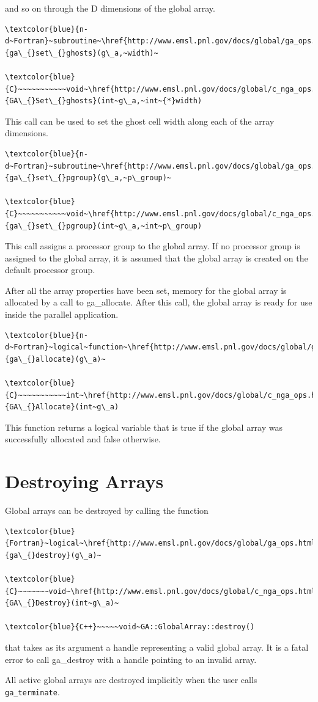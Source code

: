 and so on through the D dimensions of the global array.
\begin{verbatim}
\textcolor{blue}{n-d~Fortran}~subroutine~\href{http://www.emsl.pnl.gov/docs/global/ga_ops.html\#NGA_SET_GHOSTS}{ga\_{}set\_{}ghosts}(g\_a,~width)~

\textcolor{blue}{C}~~~~~~~~~~~void~\href{http://www.emsl.pnl.gov/docs/global/c_nga_ops.html\#GA_SET_GHOSTS}{GA\_{}Set\_{}ghosts}(int~g\_a,~int~{*}width)
\end{verbatim}
This call can be used to set the ghost cell width along each of the
array dimensions.
\begin{verbatim}
\textcolor{blue}{n-d~Fortran}~subroutine~\href{http://www.emsl.pnl.gov/docs/global/ga_ops.html\#GA_SET_PGROUP}{ga\_{}set\_{}pgroup}(g\_a,~p\_group)~

\textcolor{blue}{C}~~~~~~~~~~~void~\href{http://www.emsl.pnl.gov/docs/global/c_nga_ops.html\#GA_SET_PGROUP}{ga\_{}set\_{}pgroup}(int~g\_a,~int~p\_group)
\end{verbatim}
This call assigns a processor group to the global array. If no processor
group is assigned to the global array, it is assumed that the global
array is created on the default processor group.

After all the array properties have been set, memory for the global
array is allocated by a call to ga\_allocate. After this call, the
global array is ready for use inside the parallel application.
\begin{verbatim}
\textcolor{blue}{n-d~Fortran}~logical~function~\href{http://www.emsl.pnl.gov/docs/global/ga_ops.html\#GA_ALLOCATE}{ga\_{}allocate}(g\_a)~

\textcolor{blue}{C}~~~~~~~~~~~int~\href{http://www.emsl.pnl.gov/docs/global/c_nga_ops.html\#GA_ALLOCATE}{GA\_{}Allocate}(int~g\_a)
\end{verbatim}
This function returns a logical variable that is true if the global
array was successfully allocated and false otherwise. 


\section{Destroying Arrays }

Global arrays can be destroyed by calling the function
\begin{verbatim}
\textcolor{blue}{Fortran}~logical~\href{http://www.emsl.pnl.gov/docs/global/ga_ops.html\#ga_destroy}{ga\_{}destroy}(g\_a)~

\textcolor{blue}{C}~~~~~~~void~\href{http://www.emsl.pnl.gov/docs/global/c_nga_ops.html\#ga_destroy}{GA\_{}Destroy}(int~g\_a)~

\textcolor{blue}{C++}~~~~~void~GA::GlobalArray::destroy()
\end{verbatim}
that takes as its argument a handle representing a valid global array.
It is a fatal error to call ga\_destroy with a handle pointing to
an invalid array.

All active global arrays are destroyed implicitly when the user calls
\texttt{ga\_terminate}.
